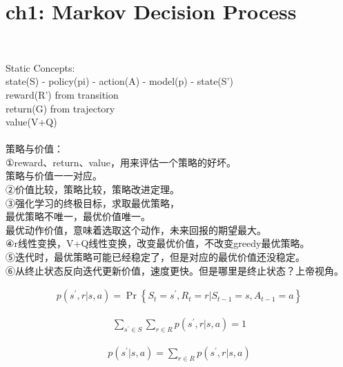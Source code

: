 \documentclass{article}
\begin{document}
\section*{ch1: Markov Decision Process}


~ \\[3pt]
\begin{CJK}{UTF8}{gbsn}
    Static Concepts: \\[3pt]
    state(S) - policy(pi) - action(A) - model(p) - state(S') \\[3pt]
    reward(R') from transition \\[3pt]
    return(G) from trajectory \\[3pt]
    value(V+Q) \\[3pt]

    ~ \\[3pt]
    策略与价值：\\[3pt]
    ①reward、return、value，用来评估一个策略的好坏。 \\[3pt]
    策略与价值一一对应。 \\[3pt]
    ②价值比较，策略比较，策略改进定理。 \\[3pt]
    ③强化学习的终极目标，求取最优策略， \\[3pt]
    最优策略不唯一，最优价值唯一。 \\[3pt]
    最优动作价值，意味着选取这个动作，未来回报的期望最大。 \\[3pt]
    ④r线性变换，V+Q线性变换，改变最优价值，不改变greedy最优策略。 \\[3pt]
    ⑤迭代时，最优策略可能已经稳定了，但是对应的最优价值还没稳定。 \\[3pt]
    ⑥从终止状态反向迭代更新价值，速度更快。但是哪里是终止状态？上帝视角。 \\[3pt]
\end{CJK}


\begin{align*}
    p \left( s^{\prime}, r | s, a \right) 
    = \operatorname{Pr} \left\{ S_{t}=s^{\prime}, R_{t}=r | 
    S_{t-1}=s, A_{t-1}=a \right\} 
\end{align*}

\begin{align*}
    \sum_{s^{\prime} \in S} \sum_{r \in R} 
    p \left( s^{\prime}, r | s, a \right) = 1 
\end{align*}

\begin{align*}
    p \left( s^{\prime} | s, a \right) 
    = \sum_{r \in R} p \left( s^{\prime}, r | s, a \right) 
\end{align*}
\end{document}
